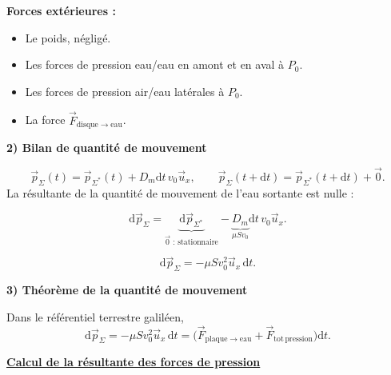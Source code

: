 \documentclass[11pt,a4paper]{article}
\newcommand{\dd}{\mathrm d}
\newcommand{\ux}{\vec u_x}\newcommand{\uy}{\vec u_y}\newcommand{\uz}{\vec u_z}
\newcommand{\titr}[1]{\par\textbf{\underline{#1}}\par\nopagebreak[3]}
\newcommand{\sys}{\Sigma^*}
\newcommand{\etape}[1]{\par\medskip\textbf{#1}\par\nopagebreak[4]}
\newcommand{\jetbase}{\draw[blue!65!black,thick](0,.35)..controls(2,.35)and(3.5,.4)..(3.7,1.3)--(3.7,2);\draw[blue!65!black,thick](0,-.35)..controls(2,-.35)and(3.5,-.4)..(3.7,-1.3)--(3.7,-2);\draw[blue!65!black,thick](4,-2)--(4,2);}
\begin{document}
\begin{exemple}[breakable]
\begin{minipage}{\linewidth}
\textbf{Forces extérieures :}
\begin{itemize}
\item Le poids, négligé.
\item Les forces de pression eau/eau en amont et en aval à $P_0$.
\item Les forces de pression air/eau latérales à $P_0$.
\item La force $\vec F_{\mathrm{disque}\to\mathrm{eau}}$.
\end{itemize}
\end{minipage}\par
\etape{2) Bilan de quantité de mouvement}
\[\vec p_\Sigma(t)=\vec p_{\sys}(t)+D_m\dd t\,v_0\ux,\qquad\vec p_\Sigma(t+\dd t)=\vec p_{\sys}(t+\dd t)+\vec0.\]
La résultante de la quantité de mouvement de l'eau sortante est nulle :
\begin{center}\end{center}
\[\dd\vec p_\Sigma=\underbrace{\dd\vec p_{\sys}}_{\vec0\text{ : stationnaire}}-\underbrace{D_m}_{\mu Sv_0}\dd t\,v_0\ux.\]
\begin{cadre}\[\dd\vec p_\Sigma=-\mu Sv_0^2\ux\,\dd t.\]\end{cadre}
\etape{3) Théorème de la quantité de mouvement}
Dans le référentiel terrestre galiléen,
\[\dd\vec p_\Sigma=-\mu Sv_0^2\ux\,\dd t=\bigl(\vec F_{\mathrm{plaque}\to\mathrm{eau}}+\vec F_{\mathrm{tot\,pression}}\bigr)\dd t.\]
\titr{Calcul de la résultante des forces de pression}
\begin{center}
\end{center}
\end{exemple}
\end{document}
